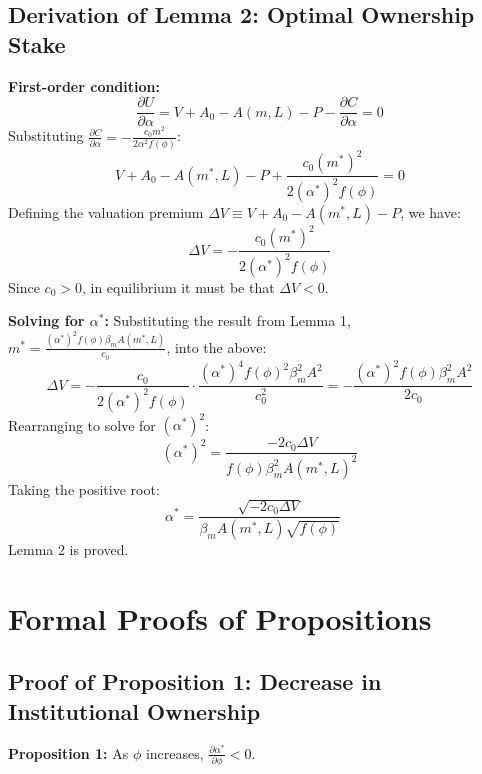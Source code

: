 \documentclass[12pt,a4paper]{article}
\begin{document}
\subsection{Derivation of Lemma 2: Optimal Ownership Stake}
\textbf{First-order condition:}
\begin{equation}
\frac{\partial U}{\partial \alpha} = V + A_0 - A(m, L) - P - \frac{\partial C}{\partial \alpha} = 0
\end{equation}
Substituting $\frac{\partial C}{\partial \alpha} = -\frac{c_0 m^2}{2 \alpha^2 f(\phi)}$:
\begin{equation}
V + A_0 - A(m^*, L) - P + \frac{c_0 (m^*)^2}{2 (\alpha^*)^2 f(\phi)} = 0
\end{equation}
Defining the valuation premium $\Delta V \equiv V + A_0 - A(m^*, L) - P$, we have:
\begin{equation}
\Delta V = -\frac{c_0 (m^*)^2}{2 (\alpha^*)^2 f(\phi)}
\end{equation}
Since $c_0 > 0$, in equilibrium it must be that $\Delta V < 0$.

\textbf{Solving for $\alpha^*$:}
Substituting the result from Lemma 1, $m^* = \frac{(\alpha^*)^2 f(\phi) \beta_m A(m^*, L)}{c_0}$, into the above:
\begin{equation}
\Delta V = -\frac{c_0}{2 (\alpha^*)^2 f(\phi)} \cdot \frac{(\alpha^*)^4 f(\phi)^2 \beta_m^2 A^2}{c_0^2} = -\frac{(\alpha^*)^2 f(\phi) \beta_m^2 A^2}{2 c_0}
\end{equation}
Rearranging to solve for $(\alpha^*)^2$:
\begin{equation}
(\alpha^*)^2 = \frac{-2 c_0 \Delta V}{f(\phi) \beta_m^2 A(m^*, L)^2}
\end{equation}
Taking the positive root:
\begin{equation}
\alpha^* = \frac{\sqrt{-2 c_0 \Delta V}}{\beta_m A(m^*, L) \sqrt{f(\phi)}} \quad 
\end{equation}
Lemma 2 is proved. 

\section{Formal Proofs of Propositions}\label{app:F}
\subsection{Proof of Proposition 1: Decrease in Institutional Ownership}
\textbf{Proposition 1:} As $\phi$ increases, $\frac{\partial \alpha^*}{\partial \phi} < 0$.
\end{document}
